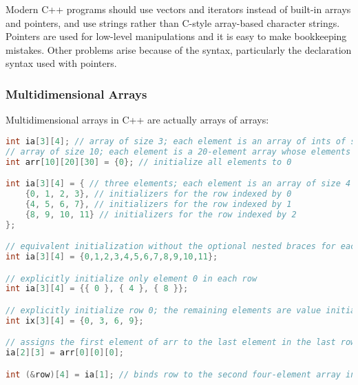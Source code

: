 Modern C++ programs should use vectors and iterators instead of built-in arrays and pointers, and use strings rather than C-style array-based character strings. Pointers are used for low-level manipulations and it is easy to make bookkeeping mistakes. Other problems arise because of the syntax, particularly the declaration syntax used with pointers.

\subsubsection{Multidimensional Arrays}

Multidimensional arrays in C++ are actually arrays of arrays:
\begin{lstlisting}[language=C++]
int ia[3][4]; // array of size 3; each element is an array of ints of size 4 
// array of size 10; each element is a 20-element array whose elements are arrays of 30 ints 
int arr[10][20][30] = {0}; // initialize all elements to 0

int ia[3][4] = { // three elements; each element is an array of size 4 
    {0, 1, 2, 3}, // initializers for the row indexed by 0 
    {4, 5, 6, 7}, // initializers for the row indexed by 1 
    {8, 9, 10, 11} // initializers for the row indexed by 2 
};

// equivalent initialization without the optional nested braces for each row 
int ia[3][4] = {0,1,2,3,4,5,6,7,8,9,10,11};

// explicitly initialize only element 0 in each row 
int ia[3][4] = {{ 0 }, { 4 }, { 8 }};

// explicitly initialize row 0; the remaining elements are value initialized 
int ix[3][4] = {0, 3, 6, 9};

// assigns the first element of arr to the last element in the last row of ia 
ia[2][3] = arr[0][0][0]; 

int (&row)[4] = ia[1]; // binds row to the second four-element array in ia
\end{lstlisting}
